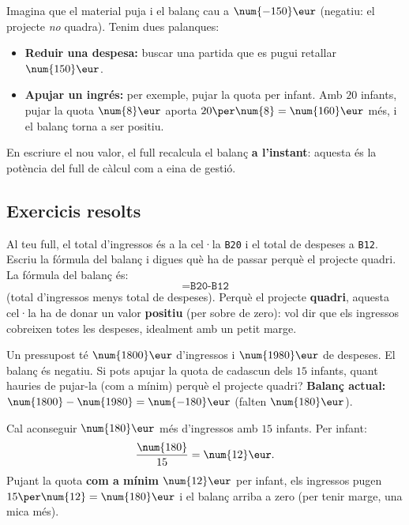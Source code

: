 \begin{exemple}
Imagina que el material puja i el balanç cau a $\num{-150}\eur$ (negatiu: el projecte
\emph{no} quadra). Tenim dues palanques:
\begin{itemize}[leftmargin=1.4em, itemsep=1pt]
  \item \textbf{Reduir una despesa:} buscar una partida que es pugui retallar
        $\num{150}\eur$.
  \item \textbf{Apujar un ingrés:} per exemple, pujar la quota per infant. Amb $20$
        infants, pujar la quota $\num{8}\eur$ aporta $20\per\num{8}=\num{160}\eur$
        més, i el balanç torna a ser positiu.
\end{itemize}
En escriure el nou valor, el full recalcula el balanç \textbf{a l'instant}: aquesta és
la potència del full de càlcul com a eina de gestió.
\end{exemple}

\subsection{Exercicis resolts}

\begin{exresolt}
Al teu full, el total d'ingressos és a la cel·la \texttt{B20} i el total de despeses a
\texttt{B12}. Escriu la fórmula del balanç i digues què ha de passar perquè el projecte
quadri.
\solucio
La fórmula del balanç és:
\[
\texttt{=B20-B12}
\]
(total d'ingressos menys total de despeses). Perquè el projecte \textbf{quadri},
aquesta cel·la ha de donar un valor \textbf{positiu} (per sobre de zero): vol dir que
els ingressos cobreixen totes les despeses, idealment amb un petit marge.
\end{exresolt}

\begin{exresolt}
Un pressupost té $\num{1800}\eur$ d'ingressos i $\num{1980}\eur$ de despeses. El balanç
és negatiu. Si pots apujar la quota de cadascun dels $15$ infants, quant hauries de
pujar-la (com a mínim) perquè el projecte quadri?
\solucio
\textbf{Balanç actual:} $\num{1800}-\num{1980}=\num{-180}\eur$ (falten $\num{180}\eur$).

Cal aconseguir $\num{180}\eur$ més d'ingressos amb $15$ infants. Per infant:
\[
\frac{\num{180}}{15}=\num{12}\eur.
\]
Pujant la quota \textbf{com a mínim $\num{12}\eur$} per infant, els ingressos pugen
$15\per\num{12}=\num{180}\eur$ i el balanç arriba a zero (per tenir marge, una mica
més).
\end{exresolt}

